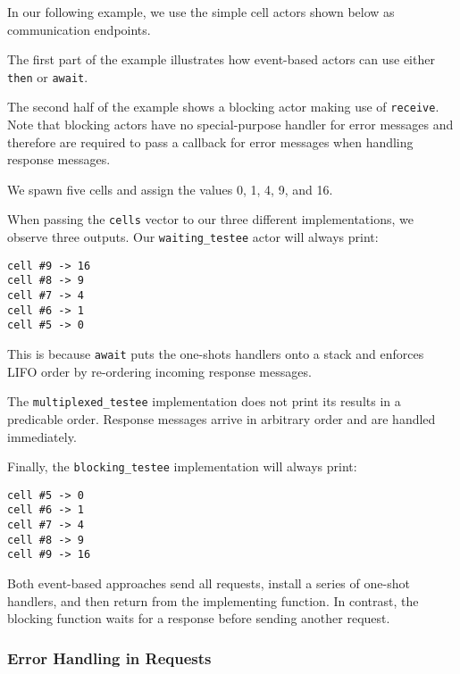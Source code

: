 In our following example, we use the simple cell actors shown below as
communication endpoints.


The first part of the example illustrates how event-based actors can use either
\lstinline^then^ or \lstinline^await^.


\clearpage

The second half of the example shows a blocking actor making use of
\lstinline^receive^. Note that blocking actors have no special-purpose handler
for error messages and therefore are required to pass a callback for error
messages when handling response messages.


We spawn five cells and assign the values 0, 1, 4, 9, and 16.


When passing the \lstinline^cells^ vector to our three different
implementations, we observe three outputs. Our \lstinline^waiting_testee^ actor
will always print:

{\footnotesize\begin{verbatim}
cell #9 -> 16
cell #8 -> 9
cell #7 -> 4
cell #6 -> 1
cell #5 -> 0
\end{verbatim}}

This is because \lstinline^await^ puts the one-shots handlers onto a stack and
enforces LIFO order by re-ordering incoming response messages.

The \lstinline^multiplexed_testee^ implementation does not print its results in
a predicable order. Response messages arrive in arbitrary order and are handled
immediately.

Finally, the \lstinline^blocking_testee^ implementation will always print:

{\footnotesize\begin{verbatim}
cell #5 -> 0
cell #6 -> 1
cell #7 -> 4
cell #8 -> 9
cell #9 -> 16
\end{verbatim}}

Both event-based approaches send all requests, install a series of one-shot
handlers, and then return from the implementing function. In contrast, the
blocking function waits for a response before sending another request.

\clearpage
\subsubsection{Error Handling in Requests}
\label{error-response}

